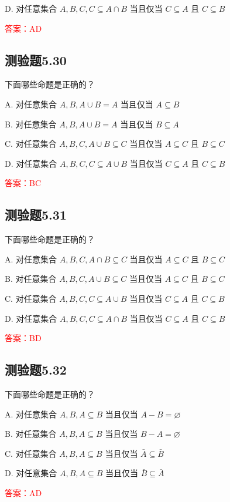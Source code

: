 \documentclass[UTF8, heading=true]{ctexart}
\begin{document}
D. 对任意集合 $A, B, C, C \subseteq A \cap B$ 当且仅当 $C \subseteq A$ 且 $C \subseteq B$

\textcolor{red}{答案：AD}

\subsection{测验题5.30}
下面哪些命题是正确的？

A. 对任意集合 $A, B, A \cup B=A$ 当且仅当 $A \subseteq B$

B. 
对任意集合 $A, B, A \cup B=A$ 当且仅当 $B \subseteq A$

C. 
对任意集合 $A, B, C, A \cup B \subseteq C$ 当且仅当 $A \subseteq C$ 且 $B \subseteq C$

D. 
对任意集合 $A, B, C, C \subseteq A \cup B$ 当且仅当 $C \subseteq A$ 且 $C \subseteq B$

\textcolor{red}{答案：BC}

\subsection{测验题5.31}

下面哪些命题是正确的？

A. 对任意集合 $A, B, C, A \cap B \subseteq C$ 当且仅当 $A \subseteq C$ 且 $B \subseteq C$

B. 对任意集合 $A, B, C, A \cup B \subseteq C$ 当且仅当 $A \subseteq C$ 且 $B \subseteq C$

C. 对任意集合 $A, B, C, C \subseteq A \cup B$ 当且仅当 $C \subseteq A$ 且 $C \subseteq B$

D. 对任意集合 $A, B, C, C \subseteq A \cap B$ 当且仅当 $C \subseteq A$ 且 $C \subseteq B$

\textcolor{red}{答案：BD}

\subsection{测验题5.32}
下面哪些命题是正确的？

A. 
对任意集合 $A, B, A \subseteq B$ 当且仅当 $A-B=\varnothing$

B. 
对任意集合 $A, B, A \subseteq B$ 当且仅当 $B-A=\varnothing$

C. 
对任意集合 $A, B, A \subseteq B$ 当且仅当 $\bar{A} \subseteq \bar{B}$

D. 
对任意集合 $A, B, A \subseteq B$ 当且仅当 $\bar{B} \subseteq \bar{A}$

\textcolor{red}{答案：AD}
\end{document}
